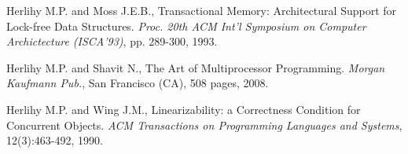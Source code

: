 \begin{thebibliography}{99}
{
Herlihy M.P.  and Moss J.E.B., 
Transactional Memory: Architectural Support for Lock-free Data Structures. 
{\it Proc. 20th ACM Int'l Symposium  on Computer Archictecture (ISCA'93)}, 
pp. 289-300, 1993. 


% 
% 
% 
% 




Herlihy M.P.  and Shavit N.,
The Art of Multiprocessor Programming. 
{\it Morgan Kaufmann Pub.}, San Francisco (CA), 508 pages, 2008. 




Herlihy M.P.  and Wing J.M.,
Linearizability: a Correctness Condition for Concurrent Objects. 
{\it ACM Transactions on Programming Languages and Systems}, 
12(3):463-492, 1990. 

% 
% 
% 









}
\end{thebibliography}
